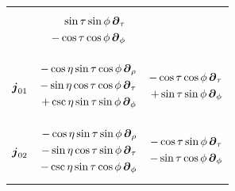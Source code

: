 \documentclass[a4paper,12pt]{article}
\begin{document}
\begin{table}[H]
\begin{adjustbox}{width=0.80\textwidth}
\begin{tabular}{ccc}
{\begin{equation*}
\begin{split}
                        \end{split}
                     \end{equation*}} & \parbox{0.3\textwidth}{\begin{equation*}
                        \begin{split}
                           \sin\tau \sin\phi \, \boldsymbol{\partial}_\tau \\ - \cos\tau \cos\phi \, \boldsymbol{\partial}_\phi 
                        \end{split}
                     \end{equation*}} \\
                     $\boldsymbol{j}_{0 1}$ & \parbox{0.3\textwidth}{\begin{equation*}
                        \begin{split}
                           -\cos\eta \sin\tau \cos\phi \, \boldsymbol{\partial}_\rho \\ - \sin\eta \cos\tau \cos\phi \, \boldsymbol{\partial}_\tau \\ + \csc\eta \sin\tau \sin\phi \, \boldsymbol{\partial}_\phi 
                        \end{split}
                     \end{equation*}} & \parbox{0.3\textwidth}{\begin{equation*}
                        \begin{split}
                           -\cos\tau \cos\phi \, \boldsymbol{\partial}_\tau \\ + \sin\tau \sin\phi \, \boldsymbol{\partial}_\phi 
                        \end{split}
                     \end{equation*}} \\
                     $\boldsymbol{j}_{0 2}$ & \parbox{0.3\textwidth}{\begin{equation*}
                        \begin{split}
                           -\cos\eta \sin\tau \sin\phi \, \boldsymbol{\partial}_\rho \\ - \sin\eta \cos\tau \sin\phi \, \boldsymbol{\partial}_\tau \\ - \csc\eta \sin\tau \cos\phi \, \boldsymbol{\partial}_\phi 
                        \end{split}
                     \end{equation*}} & \parbox{0.3\textwidth}{\begin{equation*}
                        \begin{split}
                           -\cos\tau \sin\phi \, \B{\partial}_\tau \\ - \sin\tau \cos\phi \, \B{\partial}_\phi 

\end{split}
\end{equation*}}
\end{tabular}
\end{adjustbox}
\end{table}
\end{document}
